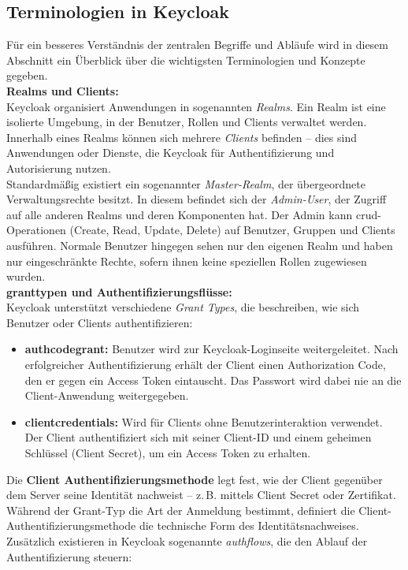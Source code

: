 \documentclass[a4paper,12pt]{article}
\begin{document}
	\subsection{Terminologien in Keycloak}
	Für ein besseres Verständnis der zentralen Begriffe und Abläufe wird in diesem Abschnitt ein Überblick über die wichtigsten Terminologien und Konzepte gegeben.
	\\[0.5em]
	\textbf{Realms und Clients:}\\
	Keycloak organisiert Anwendungen in sogenannten \textit{Realms}. Ein Realm ist eine isolierte Umgebung, in der Benutzer, Rollen und Clients verwaltet werden. Innerhalb eines Realms können sich mehrere \textit{Clients} befinden – dies sind Anwendungen oder Dienste, die Keycloak für Authentifizierung und Autorisierung nutzen.
	\\[0.5em]
	Standardmäßig existiert ein sogenannter \textit{Master-Realm}, der übergeordnete Verwaltungsrechte besitzt. In diesem befindet sich der \textit{Admin-User}, der Zugriff auf alle anderen Realms und deren Komponenten hat. Der Admin kann \gls{crud}-Operationen (Create, Read, Update, Delete) auf Benutzer, Gruppen und Clients ausführen. Normale Benutzer hingegen sehen nur den eigenen Realm und haben nur eingeschränkte Rechte, sofern ihnen keine speziellen Rollen zugewiesen wurden.
	\\[0.5em]
	\textbf{\gls{granttype}n und Authentifizierungsflüsse:}\\
	Keycloak unterstützt verschiedene \textit{Grant Types}, die beschreiben, wie sich Benutzer oder Clients authentifizieren:
	
	\begin{itemize}
		\item \textbf{\gls{authcodegrant}:} Benutzer wird zur Keycloak-Loginseite weitergeleitet. Nach erfolgreicher Authentifizierung erhält der Client einen Authorization Code, den er gegen ein Access Token eintauscht. Das Passwort wird dabei nie an die Client-Anwendung weitergegeben.
		\item \textbf{\gls{clientcredentials}:} Wird für Clients ohne Benutzerinteraktion verwendet. Der Client authentifiziert sich mit seiner Client-ID und einem geheimen Schlüssel (Client Secret), um ein Access Token zu erhalten.
	\end{itemize}
	Die \textbf{Client Authentifizierungsmethode} legt fest, wie der Client gegenüber dem Server seine Identität nachweist – z.\,B. mittels Client Secret oder Zertifikat. Während der Grant-Typ die Art der Anmeldung bestimmt, definiert die Client-Authentifizierungsmethode die technische Form des Identitätsnachweises.
	\\[0.5em]
	Zusätzlich existieren in Keycloak sogenannte \textit{\gls{authflow}s}, die den Ablauf der Authentifizierung steuern:
	
\end{document}
